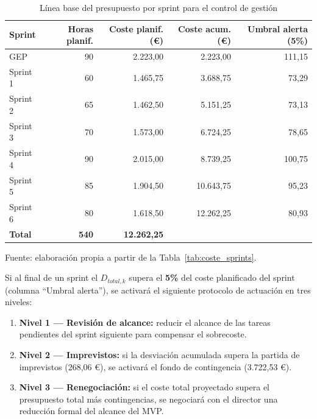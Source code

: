 \documentclass{article}
\begin{document}
    \begin{table}[H]
    \centering
    \small
    \begin{tabular}{lrrrr}
    \hline
    \textbf{Sprint} & \textbf{Horas planif.} & \textbf{Coste planif. (\euro)} & 
    \textbf{Coste acum. (\euro)} & \textbf{Umbral alerta (5\%)} \\
    \hline
    GEP         & 90  & 2.223,00 & 2.223,00  & 111,15 \\
    Sprint 1    & 60  & 1.465,75 & 3.688,75  & 73,29  \\
    Sprint 2    & 65  & 1.462,50 & 5.151,25  & 73,13  \\
    Sprint 3    & 70  & 1.573,00 & 6.724,25  & 78,65  \\
    Sprint 4    & 90  & 2.015,00 & 8.739,25  & 100,75 \\
    Sprint 5    & 85  & 1.904,50 & 10.643,75 & 95,23  \\
    Sprint 6    & 80  & 1.618,50 & 12.262,25 & 80,93  \\
    \hline
    \textbf{Total} & \textbf{540} & \textbf{12.262,25} & & \\
    \hline
    \end{tabular}
    \caption{Línea base del presupuesto por sprint para el control de gestión}
    \label{tab:control_gestion}
    \footnotesize Fuente: elaboración propia a partir de la Tabla~\ref{tab:coste_sprints}.
    \end{table}

    \justify
    Si al final de un sprint el $D_{total,k}$ supera el \textbf{5\%} del coste 
    planificado del sprint (columna ``Umbral alerta''), se activará el siguiente 
    protocolo de actuación en tres niveles:

    \begin{enumerate}[leftmargin=*, itemsep=1pt]
    \item \textbf{Nivel 1 — Revisión de alcance:} reducir el alcance de las tareas 
    pendientes del sprint siguiente para compensar el sobrecoste.
    \item \textbf{Nivel 2 — Imprevistos:} si la desviación acumulada supera la 
    partida de imprevistos (268,06 \euro), se activará el fondo de contingencia 
    (3.722,53 \euro).
    \item \textbf{Nivel 3 — Renegociación:} si el coste total proyectado supera el 
    presupuesto total más contingencias, se negociará con el director una reducción 
    formal del alcance del MVP.
    \end{enumerate}
\end{document}
